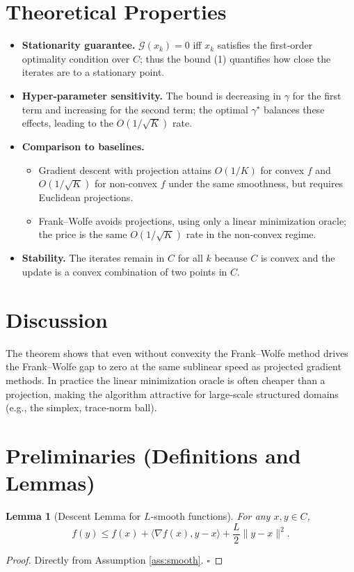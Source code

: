 \documentclass{article}
\newtheorem{lemma}{Lemma}
\newcommand{\gap}{\mathcal{G}}
\begin{document}
\section*{Theoretical Properties}
\begin{itemize}
\item \textbf{Stationarity guarantee.} $\gap(x_k)=0$ iff $x_k$ satisfies the first‑order optimality condition over $C$; thus the bound (1) quantifies how close the iterates are to a stationary point.
\item \textbf{Hyper‑parameter sensitivity.} The bound is decreasing in $\gamma$ for the first term and increasing for the second term; the optimal $\gamma^\star$ balances these effects, leading to the $O(1/\sqrt{K})$ rate.
\item \textbf{Comparison to baselines.}
  \begin{itemize}
    \item Gradient descent with projection attains $O(1/K)$ for convex $f$ and $O(1/\sqrt{K})$ for non‑convex $f$ under the same smoothness, but requires Euclidean projections.
    \item Frank–Wolfe avoids projections, using only a linear minimization oracle; the price is the same $O(1/\sqrt{K})$ rate in the non‑convex regime.
  \end{itemize}
\item \textbf{Stability.} The iterates remain in $C$ for all $k$ because $C$ is convex and the update is a convex combination of two points in $C$.
\end{itemize}

\section*{Discussion}
The theorem shows that even without convexity the Frank–Wolfe method drives the Frank–Wolfe gap to zero at the same sublinear speed as projected gradient methods.  In practice the linear minimization oracle is often cheaper than a projection, making the algorithm attractive for large‑scale structured domains (e.g., the simplex, trace‑norm ball).

\newpage
\section*{Preliminaries (Definitions and Lemmas)}
\begin{lemma}[Descent Lemma for $L$‑smooth functions]\label{lem:descent}
For any $x,y\in C$,
\[
f(y)\le f(x)+\langle\nabla f(x),y-x\rangle+\frac{L}{2}\|y-x\|^2 .
\]
\end{lemma}
\begin{proof}
Directly from Assumption \ref{ass:smooth}. \hfill $\square$
\end{proof}
\end{document}
